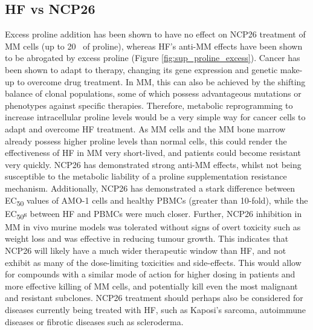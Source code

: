 \subsection{HF vs NCP26}
Excess proline addition has been shown to have no effect on NCP26 treatment of MM cells (up to 20\si{\milli\Molar} of proline), whereas HF's anti-MM effects have been shown to be abrogated by excess proline (Figure \ref{fig:sup_proline_excess}).
Cancer has been shown to adapt to therapy, changing its gene expression and genetic make-up to overcome drug treatment.
In MM, this can also be achieved by the shifting balance of clonal populations, some of which possess advantageous mutations or phenotypes against specific therapies.
Therefore, metabolic reprogramming to increase intracellular proline levels would be a very simple way for cancer cells to adapt and overcome HF treatment.
As MM cells and the MM bone marrow already possess higher proline levels than normal cells, this could render the effectiveness of HF in MM very short-lived, and patients could become resistant very quickly.
NCP26 has demonstrated strong anti-MM effects, whilst not being susceptible to the metabolic liability of a proline supplementation resistance mechanism.
Additionally, NCP26 has demonstrated a stark difference between EC\textsubscript{50} values of AMO-1 cells and healthy PBMCs (greater than 10-fold)\cite{bottpreclinical2022}, while the EC\textsubscript{50}s between HF and PBMCs were much closer.
Further, NCP26 inhibition in MM in vivo murine models was tolerated without signs of overt toxicity such as weight loss and was effective in reducing tumour growth\cite{bottpreclinical2022}.
This indicates that NCP26 will likely have a much wider therapeutic window than HF, and not exhibit as many of the dose-limiting toxicities and side-effects.
This would allow for compounds with a similar mode of action for higher dosing in patients and more effective killing of MM cells, and potentially kill even the most malignant and resistant subclones.
NCP26 treatment should perhaps also be considered for diseases currently being treated with HF, such as Kaposi's sarcoma, autoimmune diseases or fibrotic diseases such as scleroderma.

